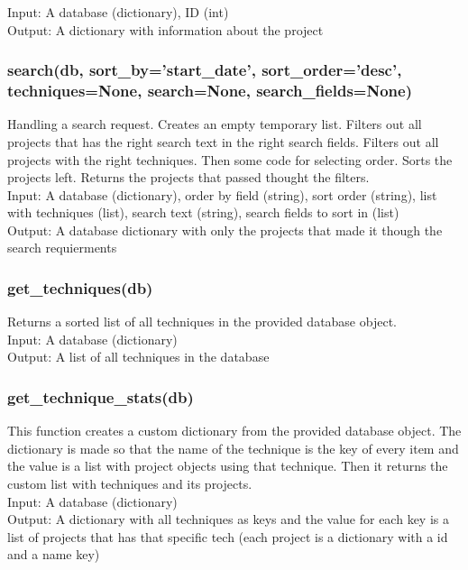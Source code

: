 \documentclass{TDP003mall}
\begin{document}
  Input: A database (dictionary), ID (int)\\
  Output: A dictionary with information about the project\\

\subsubsection{search(db, sort\_by='start\_date', sort\_order='desc', techniques=None, search=None, search\_fields=None)}
  Handling a search request.
  Creates an empty temporary list.
  Filters out all projects that has the right search text in the right search fields.
  Filters out all projects with the right techniques.
  Then some code for selecting order.
  Sorts the projects left.
  Returns the projects that passed thought the filters.\\

  Input: A database (dictionary), order by field (string), sort order (string), list with techniques (list), search text (string), search fields to sort in (list)\\
  Output: A database dictionary with only the projects that made it though the search requierments\\

\subsubsection{get\_techniques(db)}
  Returns a sorted list of all techniques in the provided database object.\\

  Input: A database (dictionary)\\
  Output: A list of all techniques in the database\\

\subsubsection{get\_technique\_stats(db)}
  This function creates a custom dictionary from the provided database object. The dictionary is made so that the name of the technique is the key of every item and the value is a list with project objects using that technique. Then it returns the custom list with techniques and its projects.\\

  Input: A database (dictionary)\\
  Output: A dictionary with all techniques as keys and the value for each key is a list of projects that has that specific tech (each project is a dictionary with a id and a name key)\\
\end{document}
